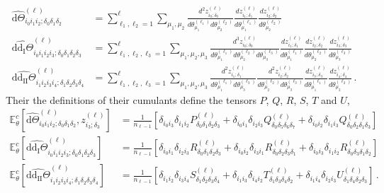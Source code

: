 \begin{align}
  \widehat{\text{d}\Theta}_{i_0 i_1 i_2; \delta_0 \delta_1 \delta_2}^{(\ell)} 
  &= \sum_{\ell_1, \ell_2 = 1}^{\ell} \sum_{\mu_1,\mu_2} 
  \frac{d^2 z_{i_{0};\delta_{0}}^{(\ell)}}{d\theta_{\mu_{1}}^{(\ell_1)} d\theta_{\mu_{2}}^{(\ell_2)}} 
  \frac{dz_{i_{1};\delta_{1}}^{(\ell)}}{d\theta_{\mu_{1}}^{(\ell_1)}}
  \frac{dz_{i_{2};\delta_{2}}^{(\ell)}}{d\theta_{\mu_{2}}^{(\ell_2)}}  \label{eq:12}\\
  \widehat{\text{dd}_{\text{I}}\Theta}_{i_0i_1i_2i_3;\delta_0\delta_1\delta_2\delta_3}^{(\ell)}
  &= \sum_{\ell_1, \ell_2, \ell_3=1}^{\ell} \sum_{\mu_{1},\mu_{2},\mu_{3}}
  \frac{d^3 z_{i_0;\delta_0}^{(\ell)}}{d\theta_{\mu_1}^{(\ell_1)} d\theta_{\mu_2}^{(\ell_2)} d\theta_{\mu_3}^{(\ell_3)}}
  \frac{dz_{i_1;\delta_1}^{(\ell)}}{d\theta_{\mu_1}^{(\ell_1)}}
  \frac{dz_{i_2;\delta_2}^{(\ell)}}{d\theta_{\mu_2}^{(\ell_2)}}
  \frac{dz_{i_3;\delta_3}^{(\ell)}}{d\theta_{\mu_3}^{(\ell_3)}}\label{eq:13}\\
  \widehat{\text{dd}_{\text{II}}\Theta}^{(\ell)}_{i_1 i_2 i_3 i_4; \delta_1 \delta_2 \delta_3 \delta_4} & = \sum_{\ell_1, \ell_2, \ell_3=1}^{\ell} \sum_{\mu_1,\mu_2, \mu_3} 
\frac{d^2 z^{(\ell)}_{i_1; \delta_1}}{d\theta_{\mu_1}^{(\ell_1)} d\theta_{\mu_3}^{(\ell_3)}} \frac{d^2 z^{(\ell)}_{i_2; \delta_2}}{d\theta_{\mu_2}^{(\ell_2)} d\theta_{\mu_3}^{(\ell_3)}} \frac{d z^{(\ell)}_{i_3; \delta_3}}{d\theta_{\mu_1}^{(\ell_1)}} \frac{d z^{(\ell)}_{i_4; \delta_4}}{d\theta_{\mu_2}^{(\ell_2)}}\,.\label{eq:14}
\end{align}
Their the definitions of their cumulants define the tensors $P$, $Q$, $R$, $S$, $T$ and $U$,
\begin{align}
  \mathbb{E}_{\theta}^{c} \left[ \widehat{\mathrm{d}\Theta}^{(\ell)}_{i_0 i_1 i_2; \delta_0 \delta_1 \delta_2 },z^{(\ell)}_{i_3; \delta_3} \right] &{=}
  \frac{1}{n_{\ell-1}} 
  \left[ 
    \delta_{i_0 i_3} \delta_{i_1 i_2} P^{(\ell)}_{\delta_0 \delta_1 \delta_2 \delta_3}
    + 
    \delta_{i_0 i_1} \delta_{i_2 i_3} Q^{(\ell)}_{\delta_0 \delta_5 \delta_6 \delta_7}
    + 
    \delta_{i_0 i_2} \delta_{i_1 i_3} Q^{(\ell)}_{\delta_{0} \delta_{2} \delta_{1} \delta_{3}}
  \right]\\
  \mathbb{E}_{\theta}^{c} \left[ \widehat{\text{dd}_{\text{I}}\Theta}_{i_0i_1i_2i_3;\delta_0\delta_1\delta_2\delta_3}^{(\ell)} \right]
  &{=} \frac{1}{n_{\ell-1}} \left[ \delta_{i_0i_1}\delta_{i_2i_3} R_{\delta_0\delta_1\delta_2\delta_3}^{(\ell)} + \delta_{i_0i_2}\delta_{i_3i_1} R_{\delta_0\delta_2\delta_3\delta_1}^{(\ell)} + \delta_{i_0i_3}\delta_{i_1i_2} R_{\delta_0\delta_3\delta_1\delta_2}^{(\ell)} \right]\\
  \mathbb{E}_{\theta}^{c} \left[ \widehat{\text{dd}_{\text{II}}\Theta}_{i_1i_2i_3i_4;\delta_1\delta_2\delta_3\delta_4}^{(\ell)} \right]
  &{=} \frac{1}{n_{\ell-1}} \left[ \delta_{i_1i_2}\delta_{i_3i_4} S_{\delta_1\delta_2\delta_3\delta_4}^{(\ell)} + \delta_{i_1i_3}\delta_{i_4i_2} T_{\delta_1\delta_3\delta_4\delta_2}^{(\ell)} + \delta_{i_1i_4}\delta_{i_2i_3} U_{\delta_1\delta_4\delta_2\delta_3}^{(\ell)} \right]\,.
\end{align}


